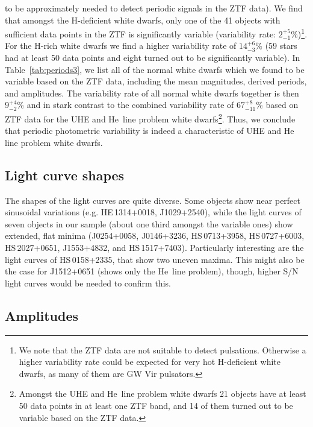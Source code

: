 \documentclass{aa}
\newcounter{Rco}
\newcommand{\Ionst}[1]{\setcounter{Rco}{#1}\Roman{Rco}}
\newcommand{\Ion}[2]{\mbox{#1\,{\scriptsize\Ionst{#2}}}}
\begin{document}
to be approximately needed to detect periodic signals in the ZTF data).
We find that amongst the H-deficient white dwarfs, only one of the 41 objects
with sufficient data points in the ZTF is significantly variable (variability
rate: $2^{+5}_{-1}$\%)\footnote{We note that the ZTF data are not suitable to
  detect pulsations. Otherwise a higher variability rate could be expected for
  very hot H-deficient white dwarfs, as many of them are GW Vir pulsators.}.
For the H-rich white dwarfs we find a higher variability rate of
$14^{+6}_{-3}$\% (59 stars had at least 50 data points and eight turned out to be significantly
variable). In Table~\ref{tab:periods3}, we list all of the normal white dwarfs which
we found to be variable based on the ZTF data, including the mean magnitudes,
derived periods, and amplitudes.
The variability rate of all normal white dwarfs together is then $9^{+4}_{-2}$\% and in
stark contrast to the combined variability rate of $67^{+8}_{-11}$\% based on ZTF data for
the UHE and \Ion{He}{2} line problem white dwarfs\footnote{Amongst the UHE and
  \Ion{He}{2} line problem white dwarfs 21 objects have at least 50 data points
in at least one ZTF band, and 14 of them turned out to be variable based on
the ZTF data.}. Thus, we conclude that periodic photometric variability is
indeed a characteristic of UHE and \Ion{He}{2} line problem white dwarfs.
 
\subsection{Light curve shapes}
\label{sect:shapes}
The shapes of the light curves are quite diverse. Some objects show near
perfect sinusoidal variations (e.g. HE\,1314+0018, J1029+2540),
while the light curves of seven objects in our sample (about one third
amongst the variable ones) show extended, flat minima (J0254+0058, J0146+3236, HS\,0713+3958,
HS\,0727+6003, HS\,2027+0651, J1553+4832, and HS\,1517+7403).
Particularly interesting are the light curves of HS\,0158+2335, that show
two uneven maxima. This might also be the case for J1512+0651 (shows only
the \Ion{He}{2} line problem), though, higher S/N light
curves would be needed to confirm this.
 
\subsection{Amplitudes}
 
\end{document}
